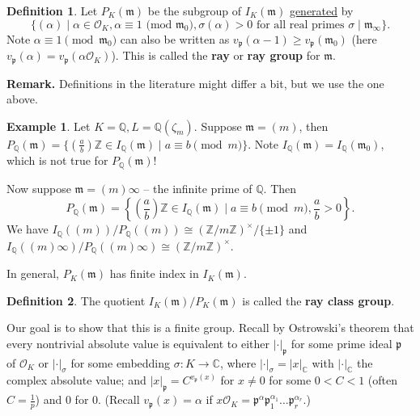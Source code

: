 \documentclass{article}
\theoremstyle{definition}
\newtheorem{example}{Example}[section]
\newtheorem{defn}{Definition}[section]
\begin{document}
\begin{defn}
    Let $P_K(\mathfrak{m})$ be the subgroup of $I_K(\mathfrak{m})$ \underline{generated} by 
    \[
        \{(\alpha) \mid \alpha \in \mathcal{O}_K, \alpha \equiv 1 \text{ (mod }\mathfrak{m}_0), \sigma(\alpha)>0 \text{ for all real primes }\sigma \mid \mathfrak{m}_{\infty}\}.
    \]
    Note $\alpha \equiv 1 \pmod{\mathfrak{m}_0}$ can also be written as $v_{\mathfrak{p}}(\alpha-1) \ge v_{\mathfrak{p}}(\mathfrak{m}_0)$ (here $v_{\mathfrak{p}}(\alpha) = v_{\mathfrak{p}}(\alpha \mathcal{O}_K)$). This is called the \textbf{ray} or \textbf{ray group} for $\mathfrak{m}$.
\end{defn}
\textbf{Remark.} Definitions in the literature might differ a bit, but we use the one above.
\begin{example}
    Let $K = \mathbb{Q}, L = \mathbb{Q}(\zeta_m)$. Suppose $\mathfrak{m} = (m)$, then $P_{\mathbb{Q}}(\mathfrak{m}) = \{\left(\frac{a}{b}\right)\mathbb{Z} \in I_{\mathbb{Q}}(\mathfrak{m}) \mid a \equiv b \pmod{m}\}$. Note $I_{\mathbb{Q}}(\mathfrak{m}) = I_{\mathbb{Q}}(\mathfrak{m}_0)$, which is not true for $P_\mathbb{Q}(\mathfrak{m})$!
    \vspace{1mm}
     
    Now suppose $\mathfrak{m} = (m)\infty$ -- the infinite prime of $\mathbb{Q}$. Then \[
    P_\mathbb{Q}(\mathfrak{m}) = \left\{\left(\frac{a}{b}\right)\mathbb{Z} \in I_\mathbb{Q}(\mathfrak{m}) \mid a \equiv b\pmod{m}, \frac{a}{b}>0\right\}.
    \]
    We have $I_{\mathbb{Q}}((m))/P_\mathbb{Q}((m)) \cong (\mathbb{Z}/m\mathbb{Z})^\times/\{\pm 1\}$ and $I_\mathbb{Q}((m)\infty)/P_\mathbb{Q}((m)\infty) \cong (\mathbb{Z}/m\mathbb{Z})^\times$. 
\end{example}
In general, $P_K(\mathfrak{m})$ has finite index in $I_K(\mathfrak{m})$.
\begin{defn}
    The quotient $I_K(\mathfrak{m})/P_K(\mathfrak{m})$ is called the \textbf{ray class group}.
\end{defn}
Our goal is to show that this is a finite group. Recall by Ostrowski's theorem that every nontrivial absolute value is equivalent to either $|\cdot|_{\mathfrak{p}}$ for some prime ideal $\mathfrak{p}$ of $\mathcal{O}_K$ or $|\cdot|_{\sigma}$ for some embedding $\sigma : K \to \mathbb{C}$, where $|\cdot|_{\sigma} = |x|_{\mathbb{C}}$ with $|\cdot|_{\mathbb{C}}$ the complex absolute value; and $|x|_{\mathfrak{p}} = C^{v_\mathfrak{p}(x)}$ for $x \neq 0$ for some $0<C<1$ (often $C =\frac{1}{p}$) and $0$ for $0$. (Recall $v_{\mathfrak{p}}(x) = \alpha$ if $x \mathcal{O}_K = \mathfrak{p}^\alpha \mathfrak{p}_1^{\alpha_1}\ldots \mathfrak{p}_r^{\alpha_r}$.)
\end{document}
